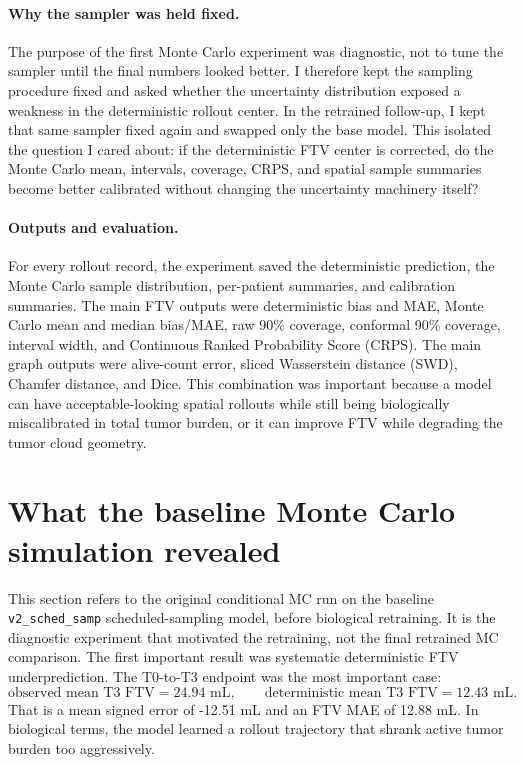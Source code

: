 \documentclass[11pt]{article}
\begin{document}
\paragraph{Why the sampler was held fixed.}
The purpose of the first Monte Carlo experiment was diagnostic, not to tune the
sampler until the final numbers looked better. I therefore kept the sampling
procedure fixed and asked whether the uncertainty distribution exposed a
weakness in the deterministic rollout center. In the retrained follow-up, I
kept that same sampler fixed again and swapped only the base model. This
isolated the question I cared about: if the deterministic FTV center is
corrected, do the Monte Carlo mean, intervals, coverage, CRPS, and spatial
sample summaries become better calibrated without changing the uncertainty
machinery itself?

\paragraph{Outputs and evaluation.}
For every rollout record, the experiment saved the deterministic prediction, the
Monte Carlo sample distribution, per-patient summaries, and calibration
summaries. The main FTV outputs were deterministic bias and MAE, Monte Carlo
mean and median bias/MAE, raw 90\% coverage, conformal 90\% coverage, interval
width, and Continuous Ranked Probability Score (CRPS). The main graph outputs
were alive-count error, sliced Wasserstein distance (SWD), Chamfer distance, and
Dice. This combination was important because a model can have acceptable-looking
spatial rollouts while still being biologically miscalibrated in total tumor
burden, or it can improve FTV while degrading the tumor cloud geometry.

\section{What the baseline Monte Carlo simulation revealed}

This section refers to the original conditional MC run on the baseline
\texttt{v2\_sched\_samp} scheduled-sampling model, before biological
retraining. It is the diagnostic experiment that motivated the retraining, not
the final retrained MC comparison. The first important result was systematic
deterministic FTV underprediction. The T0-to-T3 endpoint was the most important
case:
\[
\text{observed mean T3 FTV} = 24.94\text{ mL}, \qquad
\text{deterministic mean T3 FTV} = 12.43\text{ mL}.
\]
That is a mean signed error of -12.51 mL and an FTV MAE of 12.88 mL. In
biological terms, the model learned a rollout trajectory that shrank active
tumor burden too aggressively.
\end{document}
